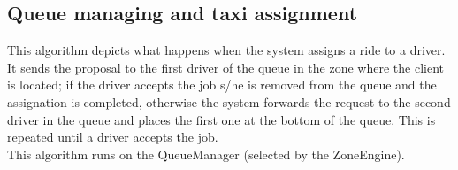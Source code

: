 \documentclass[a4paper,11pt]{report} %
\begin{document}
	\subsection{Queue managing and taxi assignment} \label{sec:AlgoQueue}
	This algorithm depicts what happens when the system assigns a ride to a driver. It sends the proposal to the first driver of the queue in the zone where the client is located; if the driver accepts the job s/he is removed from the queue and the assignation is completed, otherwise the system forwards the request to the second driver in the queue and places the first one at the bottom of the queue. This is repeated until a driver accepts the job. \\
	This algorithm runs on the QueueManager (selected by the ZoneEngine).\\
	
\end{document}
